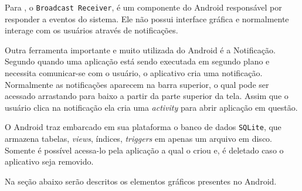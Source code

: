 	\par Para , o \texttt{Broadcast Receiver},
é um componente do Android responsável por responder a eventos do sistema.
Ele não possui interface gráfica e normalmente interage com os usuários através
de notificações.

	\par Outra ferramenta importante e muito utilizada do Android é a Notificação.
Segundo  quando uma aplicação está sendo
executada em segundo plano e necessita comunicar-se com o usuário, o aplicativo
cria uma notificação. Normalmente as notificações aparecem na barra superior, o
qual pode ser acessado arrastando para baixo a partir da parte superior da
tela. Assim que o usuário clica na notificação ela cria uma \textit{activity}
para abrir  aplicação em questão.

	\par O Android traz embarcado em sua plataforma o banco de dados
\texttt{SQLite}, que armazena tabelas, \textit{views}, índices,
\textit{triggers} em apenas um arquivo em disco. Somente é possível acessa-lo
pela aplicação a qual o criou e, é deletado caso o aplicativo seja removido.

	\par Na seção abaixo serão descritos os elementos gráficos presentes no
Android.

	